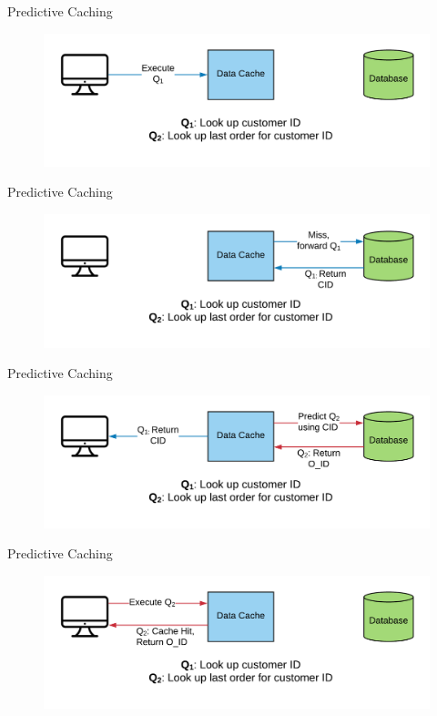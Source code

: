 \documentclass[10pt]{beamer}
\begin{document}
\begin{frame}{Predictive Caching}
    \begin{figure}
        \center
        \includegraphics[scale=0.17]{apollo_predictive_execution}
    \end{figure}
\end{frame}

\begin{frame}{Predictive Caching}
    \begin{figure}
        \center
        \includegraphics[scale=0.17]{apollo_predictive_execution_2}
    \end{figure}
\end{frame}

\begin{frame}{Predictive Caching}
    \begin{figure}
        \center
        \includegraphics[scale=0.17]{apollo_predictive_execution_4}
    \end{figure}
\end{frame}

\begin{frame}{Predictive Caching}
    \begin{figure}
        \center
        \includegraphics[scale=0.17]{apollo_predictive_execution_5}
    \end{figure}
\end{frame}
\end{document}
